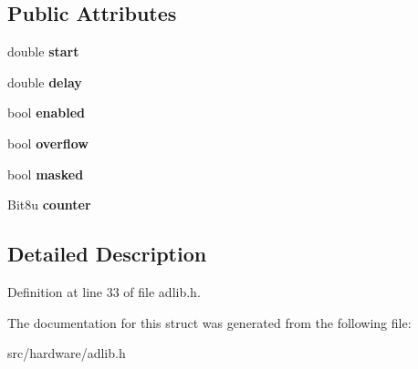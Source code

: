 \subsection*{Public Attributes}
\begin{DoxyCompactItemize}
\item 
\hypertarget{structAdlib_1_1Timer_a0c309a7bc077038d41328a824a0de28c}{double {\bfseries start}}\label{structAdlib_1_1Timer_a0c309a7bc077038d41328a824a0de28c}

\item 
\hypertarget{structAdlib_1_1Timer_a213749144ea458829f948ec4527541dc}{double {\bfseries delay}}\label{structAdlib_1_1Timer_a213749144ea458829f948ec4527541dc}

\item 
\hypertarget{structAdlib_1_1Timer_a2f108491d0950e7efb94e414683bd754}{bool {\bfseries enabled}}\label{structAdlib_1_1Timer_a2f108491d0950e7efb94e414683bd754}

\item 
\hypertarget{structAdlib_1_1Timer_addc01cad0bac2f3b3d8759626c806c6a}{bool {\bfseries overflow}}\label{structAdlib_1_1Timer_addc01cad0bac2f3b3d8759626c806c6a}

\item 
\hypertarget{structAdlib_1_1Timer_a7c2c34943910681f9a3280bf0edb853e}{bool {\bfseries masked}}\label{structAdlib_1_1Timer_a7c2c34943910681f9a3280bf0edb853e}

\item 
\hypertarget{structAdlib_1_1Timer_ae9dd32a432302f5a8a142b737cb13f89}{Bit8u {\bfseries counter}}\label{structAdlib_1_1Timer_ae9dd32a432302f5a8a142b737cb13f89}

\end{DoxyCompactItemize}


\subsection{Detailed Description}


Definition at line 33 of file adlib.\-h.



The documentation for this struct was generated from the following file\-:\begin{DoxyCompactItemize}
\item 
src/hardware/adlib.\-h\end{DoxyCompactItemize}
